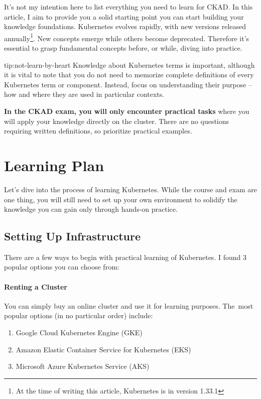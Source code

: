 It's not my intention here to list everything you need to learn for CKAD. In this article, I aim to provide you a solid starting point you can start building your knowledge foundations. Kubernetes evolves rapidly, with new versions released annually\footnote{At the time of writing this article, Kubernetes is in version 1.33.1}. New concepts emerge while others become deprecated. Therefore it's essential to grasp fundamental concepts before, or while, diving into practice.

\begin{tip}{tip:not-learn-by-heart}
	Knowledge about Kubernetes terms is important, although it is vital to note that you do not need to memorize complete definitions of every Kubernetes term or component. Instead, focus on understanding their purpose -- how and where they are used in particular contexts.  
	
	\textbf{In the CKAD exam, you will only encounter practical tasks} where you will apply your knowledge directly on the cluster. There are no questions requiring written definitions, so prioritize practical examples.
\end{tip}

\section{Learning Plan}

Let's dive into the process of learning Kubernetes. While the course and exam are one thing, you will still need to set up your own environment to solidify the knowledge you can gain only through hands-on practice.

\subsection{Setting Up Infrastructure}
\label{subsec:setting-up-infrastructure}

There are a few ways to begin with practical learning of Kubernetes. I found 3 popular options you can choose from:

\paragraph{Renting a Cluster} You can simply buy an online cluster and use it for learning purposes. The~most popular options (in no particular order) include:
\begin{enumerate}
	\item Google Cloud Kubernetes Engine (GKE)
	\item Amazon Elastic Container Service for Kubernetes (EKS)
	\item Microsoft Azure Kubernetes Service (AKS)
\end{enumerate}

